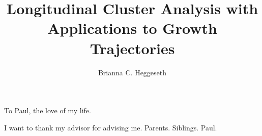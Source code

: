 \documentclass{ucbthesis}
\begin{document}

\title{Longitudinal Cluster Analysis with Applications to Growth Trajectories}
\author{Brianna C. Heggeseth}




\maketitle
\approvalpage
\copyrightpage



\begin{frontmatter}

\begin{dedication}
\null\vfil
\begin{center}
To Paul, the love of my life.\\\vspace{12pt}

\end{center}
\vfil\null
\end{dedication}

\tableofcontents
\clearpage
\listoffigures
\clearpage
\listoftables

\begin{acknowledgements}
I want to thank my advisor for advising me. Parents. Siblings. Paul.
\end{acknowledgements}

\end{frontmatter}

\pagestyle{headings}










\appendix
%
%
%
\printbibliography
\end{document}
